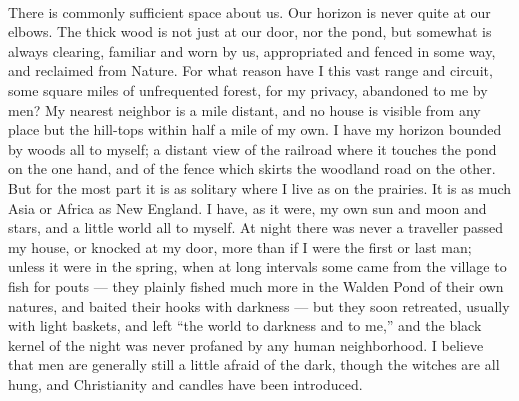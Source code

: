 \documentclass[letterpaper,12pt]{article}
\begin{document}
\paragraph{}
There is commonly sufficient space about us. Our horizon is never quite at our
elbows. The thick wood is not just at our door, nor the pond, but somewhat is
always clearing, familiar and worn by us, appropriated and fenced in some way,
and reclaimed from Nature. For what reason have I this vast range and circuit,
some square miles of unfrequented forest, for my privacy, abandoned to me by
men? My nearest neighbor is a mile distant, and no house is visible from any
place but the hill-tops within half a mile of my own. I have my horizon bounded
by woods all to myself; a distant view of the railroad where it touches the pond
on the one hand, and of the fence which skirts the woodland road on the other.
But for the most part it is as solitary where I live as on the prairies. It is
as much Asia or Africa as New England. I have, as it were, my own sun and moon
and stars, and a little world all to myself. At night there was never a
traveller passed my house, or knocked at my door, more than if I were the first
or last man; unless it were in the spring, when at long intervals some came from
the village to fish for pouts --- they plainly fished much more in the Walden
Pond of their own natures, and baited their hooks with darkness --- but they
soon retreated, usually with light baskets, and left \enquote{the world to
    darkness and to me,} and the black kernel of the night was never profaned by
any human neighborhood. I believe that men are generally still a little afraid
of the dark, though the witches are all hung, and Christianity and candles have
been introduced.
\end{document}
